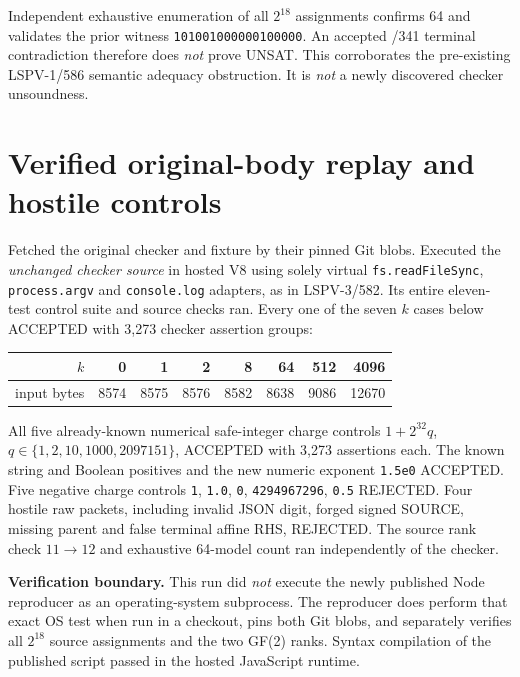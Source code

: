 \documentclass[11pt]{article}
\begin{document}
Independent exhaustive enumeration of all $2^{18}$ assignments confirms 64
and validates the prior witness \texttt{101001000000100000}.
An accepted /341 terminal contradiction therefore does \emph{not}
prove UNSAT. This corroborates the pre-existing LSPV-1/586 semantic
adequacy obstruction. It is \emph{not} a newly discovered checker unsoundness.

\section*{Verified original-body replay and hostile controls}
Fetched the original checker and fixture by their pinned Git blobs.
Executed the \emph{unchanged checker source} in hosted V8 using solely
virtual \texttt{fs.readFileSync}, \texttt{process.argv} and
\texttt{console.log} adapters, as in LSPV-3/582. Its entire eleven-test
control suite and source checks ran. Every one of the seven $k$ cases below
ACCEPTED with 3,273 checker assertion groups:
\begin{center}
\begin{tabular}{rrrrrrrr}
\toprule
$k$&0&1&2&8&64&512&4096\\
\midrule
input bytes&8574&8575&8576&8582&8638&9086&12670\\
\bottomrule
\end{tabular}
\end{center}
All five already-known numerical safe-integer charge controls
$1+2^{32}q$, $q\in\{1,2,10,1000,2097151\}$, ACCEPTED with 3,273 assertions
each. The known string and Boolean positives and the new numeric
exponent \texttt{1.5e0} ACCEPTED. Five negative charge controls
\texttt{1}, \texttt{1.0}, \texttt{0}, \texttt{4294967296}, \texttt{0.5}
REJECTED. Four hostile raw packets, including invalid JSON digit, forged
signed SOURCE, missing parent and false terminal affine RHS, REJECTED.
The source rank check $11\to12$ and exhaustive 64-model count ran
independently of the checker.

\noindent\textbf{Verification boundary.}
This run did \emph{not} execute the newly published Node reproducer as an
operating-system subprocess. The reproducer does perform that exact OS test
when run in a checkout, pins both Git blobs, and separately verifies all
$2^{18}$ source assignments and the two GF(2) ranks. Syntax compilation
of the published script passed in the hosted JavaScript runtime.
\end{document}
